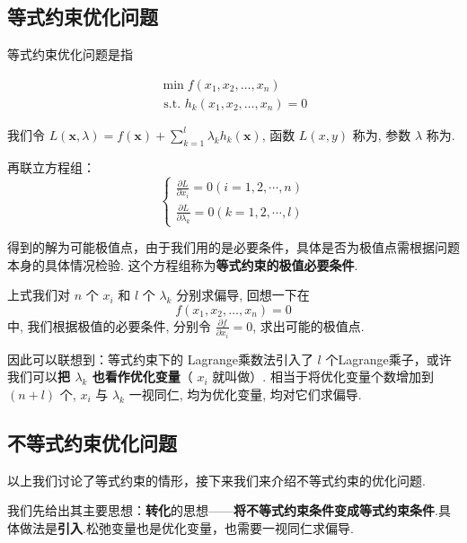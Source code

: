\subsection{等式约束优化问题}

等式约束优化问题是指

\begin{problem}[等式约束优化问题]
    $$
\begin{array}{l}
\min f\left(x_{1}, x_{2}, \ldots, x_{n}\right) \\
\text { s.t. } h_{k}\left(x_{1}, x_{2}, \ldots, x_{n}\right)=0
\end{array}
$$
\end{problem}


我们令 $ L(\mathbf{x}, \lambda)=f(\mathbf{x})+\sum_{k=1}^{l} \lambda_{k} h_{k}(\mathbf{x}) $, 函数 $ L(x, y) $ 称为, 参数 $ \lambda $ 称为.

再联立方程组： 
$$ \left\{\begin{array}{l}\frac{\partial L}{\partial x_{i}}=0(i=1,2, \cdots, n) \\ \frac{\partial L}{\partial \lambda_{k}}=0(k=1,2, \cdots, l)\end{array}\right. $$

得到的解为可能极值点，由于我们用的是必要条件，具体是否为极值点需根据问题本身的具体情况检验. 这个方程组称为\textbf{等式约束的极值必要条件}.

上式我们对 $ n $ 个 $ x_{i} $ 和 $ l $ 个 $ \lambda_{k} $ 分别求偏导, 回想一下在 
$$ f\left(x_{1}, x_{2}, \ldots, x_{n}\right)=0 $$ 
中, 我们根据极值的必要条件, 分别令 $ \frac{\partial f}{\partial x_{i}}=0 $, 求出可能的极值点. 

因此可以联想到：等式约束下的 Lagrange乘数法引入了 $ l $ 个Lagrange乘子，或许我们可以\textbf{把 $ \lambda_{k} $ 也看作优化变量}（ $ x_{i} $ 就叫做）. 相当于将优化变量个数增加到 $ (n+l) $ 个, $ x_{i} $ 与 $ \lambda_{k} $ 一视同仁, 均为优化变量, 均对它们求偏导.

\subsection{不等式约束优化问题}

以上我们讨论了等式约束的情形，接下来我们来介绍不等式约束的优化问题.

我们先给出其主要思想：\textbf{转化}的思想——\textbf{将不等式约束条件变成等式约束条件}.具体做法是\textbf{引入}.松弛变量也是优化变量，也需要一视同仁求偏导.

